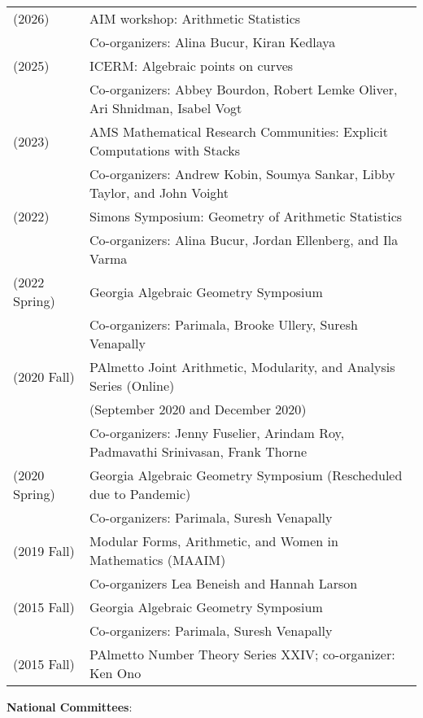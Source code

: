 \documentclass[margin,line]{res}
\newcommand{\defi}[1]{\textsf{#1}} 				%
\begin{document}
\begin{resume}
  \begin{tabular}{ll}
    (2026) & \defi{AIM workshop: Arithmetic Statistics} \\
           & Co-organizers: Alina Bucur, Kiran Kedlaya \\
    (2025) & \defi{ICERM: Algebraic points on curves} \\
           & Co-organizers: Abbey Bourdon, Robert Lemke Oliver, Ari Shnidman, Isabel Vogt \\
    (2023) & \defi{AMS Mathematical Research Communities: Explicit Computations with Stacks} \\
           & Co-organizers: Andrew Kobin, Soumya Sankar, Libby Taylor, and John Voight \\
  (2022) & \defi{Simons Symposium: Geometry of Arithmetic Statistics} \\
  & Co-organizers: Alina Bucur, Jordan Ellenberg, and Ila Varma \\    
  (2022 Spring) & \defi{Georgia Algebraic Geometry Symposium}\\
               & Co-organizers: Parimala, Brooke Ullery, Suresh Venapally   \\
  (2020 Fall) & \defi{PAlmetto Joint Arithmetic, Modularity, and Analysis Series} (Online)\\
               & (September 2020 and December 2020)\\
               & Co-organizers: Jenny Fuselier, Arindam Roy, Padmavathi Srinivasan, Frank Thorne \\
  (2020 Spring) & \defi{Georgia Algebraic Geometry Symposium} (Rescheduled due to Pandemic) \\
               & Co-organizers: Parimala, Suresh Venapally   \\
  (2019 Fall) & \defi{Modular Forms, Arithmetic, and Women in Mathematics} (MAAIM) \\
               & Co-organizers Lea Beneish and Hannah Larson \\  
  (2015 Fall) & \defi{Georgia Algebraic Geometry Symposium} \\
               &  Co-organizers: Parimala, Suresh Venapally   \\
 (2015 Fall) & \defi{PAlmetto Number Theory Series XXIV}; co-organizer: Ken Ono  \\
\end{tabular}

\textbf{National Committees}: 
  \vspace*{-.15in}
  

\end{resume}
\end{document}

